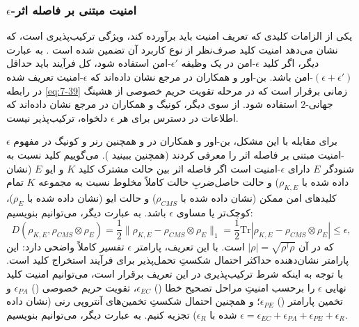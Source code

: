 \subsubsection{$\epsilon$-امنیت مبتنی بر فاصله اثر}
\label{subsec:7-4-2-1}
یکی از الزامات کلیدی که تعریف امنیت باید برآورده کند، ویژگی ترکیب‌پذیری است، که نشان می‌دهد امنیت کلید صرف‌نظر از نوع کاربرد آن تضمین شده است \cite{7-46}. به عبارت دیگر، اگر کلید $\epsilon$-امن در یک وظیفه $\epsilon'$-امن استفاده شود، کل فرآیند باید حداقل $(\epsilon + \epsilon')$-امن باشد. بن-اور و همکاران در مرجع \cite{7-58} نشان داده‌اند که $\epsilon$-امنیت تعریف شده در رابطه \eqref{eq:7-39} زمانی برقرار است که در مرحله تقویت حریم خصوصی از هشینگ جهانی-$2$ استفاده شود. از سوی دیگر، کونیگ و همکاران در مرجع \cite{7-59} نشان داده‌اند که اطلاعات در دسترس برای هر $\epsilon$ دلخواه، ترکیب‌پذیر نیست.

برای مقابله با این مشکل، بن-اور و همکاران در \cite{7-58} و همچنین رنر و کونیگ در \cite{7-60} مفهوم $\epsilon$-امنیت مبتنی بر فاصله اثر را معرفی کردند (همچنین ببینید \cite{7-29, 7-43, 7-61, 7-62, 7-63}). می‌گوییم کلید نسبت به شنودگر $E$ دارای $\epsilon$-امنیت است اگر فاصله اثر بین حالت مشترک کلید $K$ و ایو $E$ (نشان داده شده با $\rho_{K,E}$) و حالت حاصل‌ضربِ حالت کاملاً مخلوط نسبت به مجموعه $K$ تمام کلیدهای امن ممکن (نشان داده شده با $\rho_{CMS}$) و حالت ایو (نشان داده شده با $\rho_E$)، کوچک‌تر یا مساوی $\epsilon$ باشد. به عبارت دیگر، می‌توانیم بنویسیم:
\begin{equation}
	D(\rho_{K,E}, \rho_{CMS} \otimes \rho_E) = \frac{1}{2} \|\rho_{K,E} - \rho_{CMS} \otimes \rho_E\|_1 = \frac{1}{2} \text{Tr} |\rho_{K,E} - \rho_{CMS} \otimes \rho_E| \leq \epsilon,
	\label{eq:7-40}
\end{equation}
که در آن $|\rho| = \sqrt{\rho^\dagger \rho}$ است. با این تعریف، پارامتر $\epsilon$ تفسیر کاملاً واضحی دارد: این پارامتر نشان‌دهنده حداکثر احتمال شکستِ تحمل‌پذیر برای فرآیند استخراج کلید است. با توجه به اینکه شرط ترکیب‌پذیری در این تعریف برقرار است، می‌توانیم امنیت کلید نهایی $\epsilon$ را برحسب امنیتِ مراحل تصحیح خطا () $\epsilon_{EC}$، تقویت حریم خصوصی () $\epsilon_{PA}$ و تخمین پارامتر () $\epsilon_{PE}$؛ و همچنین احتمال شکستِ تخمین‌های آنتروپی رنی \cite{7-58} (نشان داده شده با $\epsilon_R$) تجزیه کنیم. به عبارت دیگر، می‌توانیم بنویسیم $\epsilon = \epsilon_{EC} + \epsilon_{PA} + \epsilon_{PE} + \epsilon_R$.

